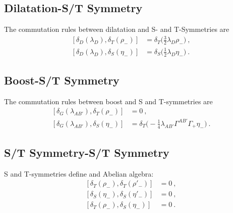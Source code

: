 \documentclass[a4paper,10pt,openany]{article}
\begin{document}
	\subsection{Dilatation-S/T Symmetry}
	The commutation rules between dilatation and S- and T-Symmetries are
	\begin{subequations}
		\begin{align}
			[\delta_{D}(\lambda_{D}),\delta_{T}(\rho_{-})]&=\delta_{T}\bigg(\frac{3}{2}\lambda_{D}\rho_{-}\bigg)\ , \\
			[\delta_{D}(\lambda_{D}),\delta_{S}(\eta_{-})]&=\delta_{S}\bigg(\frac{1}{2}\lambda_{D}\eta_{-}\bigg)\ .
		\end{align}
	\end{subequations}
	\subsection{Boost-S/T Symmetry}
	The commutation rules between boost and S and T-symmetries are
	\begin{subequations}
		\begin{align}
			[\delta_{G}(\lambda_{AB'}),\delta_{T}(\rho_{-})]&=0\ , \\
			[\delta_{G}(\lambda_{AB'}),\delta_{S}(\eta_{-})]&=\delta_{T}\bigg(-\frac{1}{4}\lambda_{AB'}\Gamma^{AB'}\Gamma_{+}\eta_{-}\bigg)\ .
		\end{align}
	\end{subequations}
	\subsection{S/T Symmetry-S/T Symmetry}\label{sec:algstst}
	S and T-symmetries define and Abelian algebra:
	\begin{subequations}
		\begin{align}
			[\delta_{T}(\rho_{-}),\delta_{T}(\rho'_{-})]&=0\ , \\
			[\delta_{S}(\eta_{-}),\delta_{S}(\eta'_{-})]&=0\ , \\
			[\delta_{T}(\rho_{-}),\delta_{S}(\eta_{-})]&=0\ .
		\end{align}
	\end{subequations}
	
	
	
	
	
\end{document}
